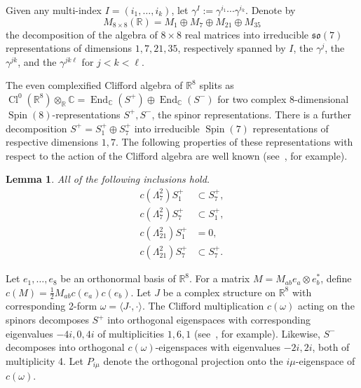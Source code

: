 \documentclass{article}
\newcommand{\real}{\mathbb{R}}
\newcommand{\comp}{\mathbb{C}}
\newcommand{\so}{\mathfrak{so}}
\DeclareMathOperator\Spin{Spin}
\DeclareMathOperator\End{End}
\DeclareMathOperator{\Cl}{Cl}
\newtheorem{lemma}[theorem]{Lemma}
\theoremstyle{definition}
\theoremstyle{remark}
\begin{document}
Given any multi-index $I = (i_1,\ldots,i_k)$, let $\gamma^I := \gamma^{i_1} \cdots \gamma^{i_k}$.
Denote by
\begin{equation}
    \label{eq:matdecomp}
    M_{8\times 8}(\real) = M_1 \oplus M_7 \oplus M_{21} \oplus M_{35}
\end{equation}
the decomposition of the algebra of $8 \times 8$ real matrices into irreducible $\so(7)$ representations of dimensions $1, 7, 21, 35$, respectively spanned by $I$, the $\gamma^j$, the $\gamma^{jk}$, and the $\gamma^{jk\ell}$ for $j < k < \ell$. 

The even complexified Clifford algebra of $\real^8$ splits as $\Cl^0(\real^8) \otimes_{\real} \comp = \End_{\comp}(S^+) \oplus \End_{\comp}(S^-)$ for two complex 8-dimensional $\Spin(8)$-representations $S^+, S^-$, the spinor representations.
There is a further decomposition $S^+ = S^+_1 \oplus S^+_7$ into irreducible $\Spin(7)$ representations of respective dimensions $1, 7$.
The following properties of these representations with respect to the action of the Clifford algebra are well known (see~\cite[Ch.~13]{joyceCompactManifoldsSpecial2000}, for example).
\begin{lemma}
    \label{lem:alg:spin7basic}
    All of the following inclusions hold.
    \begin{align*}
        c(\Lambda^2_7) S^+_1 &\subset S^+_7, \\
        c(\Lambda^2_7) S^+_7 &\subset S^+_1, \\
        c(\Lambda^2_{21}) S^+_1 &= 0, \\
        c(\Lambda^2_{21}) S^+_7 &\subset S^+_7.
    \end{align*}
\end{lemma}

Let $e_1, \ldots, e_8$ be an orthonormal basis of $\real^8$.
For a matrix $M = M_{ab} e_a \otimes e_b^*$, define $c(M) = \frac{1}{2} M_{ab} c(e_a) c(e_b)$.
Let $J$ be a complex structure on $\real^8$ with corresponding 2-form $\omega = \langle J\cdot, \cdot\rangle$.
The Clifford multiplication $c(\omega)$ acting on the spinors decomposes $S^+$ into orthogonal eigenspaces with corresponding eigenvalues $-4i, 0, 4i$ of multiplicities $1, 6, 1$ (see~\cite[Lemma~7.10]{bravermanVanishingTheoremsKernel1998}, for example).
Likewise, $S^-$ decomposes into orthogonal $c(\omega)$-eigenspaces with eigenvalues $-2i, 2i$, both of multiplicity 4.
Let $P_{i\mu}$ denote the orthogonal projection onto the $i\mu$-eigenspace of $c(\omega)$.
\end{document}
